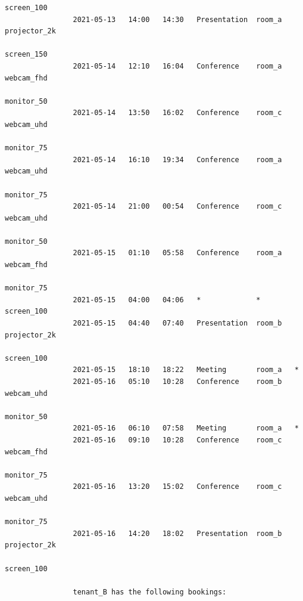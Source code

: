 \documentclass{article}
\begin{document}
\begin{Verbatim}[gobble=8]
                                                                    screen_100
                2021-05-13   14:00   14:30   Presentation  room_a   projector_2k
                                                                    screen_150
                2021-05-14   12:10   16:04   Conference    room_a   webcam_fhd
                                                                    monitor_50
                2021-05-14   13:50   16:02   Conference    room_c   webcam_uhd
                                                                    monitor_75
                2021-05-14   16:10   19:34   Conference    room_a   webcam_uhd
                                                                    monitor_75
                2021-05-14   21:00   00:54   Conference    room_c   webcam_uhd
                                                                    monitor_50
                2021-05-15   01:10   05:58   Conference    room_a   webcam_fhd
                                                                    monitor_75
                2021-05-15   04:00   04:06   *             *        screen_100
                2021-05-15   04:40   07:40   Presentation  room_b   projector_2k
                                                                    screen_100
                2021-05-15   18:10   18:22   Meeting       room_a   *
                2021-05-16   05:10   10:28   Conference    room_b   webcam_uhd
                                                                    monitor_50
                2021-05-16   06:10   07:58   Meeting       room_a   *
                2021-05-16   09:10   10:28   Conference    room_c   webcam_fhd
                                                                    monitor_75
                2021-05-16   13:20   15:02   Conference    room_c   webcam_uhd
                                                                    monitor_75
                2021-05-16   14:20   18:02   Presentation  room_b   projector_2k
                                                                    screen_100
                
                tenant_B has the following bookings:
                

\end{Verbatim}
\end{document}

